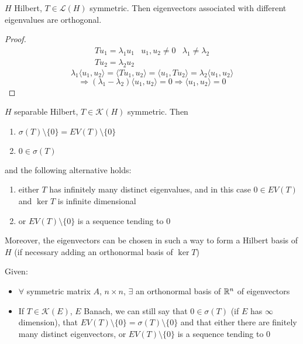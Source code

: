 \begin{proposition}
    \(H\) Hilbert, \(T \in \mathcal{L}(H)\) symmetric. Then eigenvectors associated with different eigenvalues are orthogonal. 
\end{proposition}
\begin{proof}
    \[
        \begin{array}{ccc}
            Tu_1 = \lambda_1 u_1 & u_1, u_2 \neq 0 & \lambda_1 \neq \lambda_2 \\
            Tu_2 = \lambda_2 u_2 
        \end{array}
    \]
    \[
        \lambda_1 \langle u_1, u_2 \rangle = \langle Tu_1, u_2\rangle = \langle u_1, T u_2\rangle = \lambda_2 \langle u_1, u_2\rangle
    \]
    \[
        \Rightarrow (\lambda_1 - \lambda_2) \langle u_1, u_2\rangle = 0 \Rightarrow \langle u_1, u_2\rangle = 0
    \]
\end{proof}

\begin{theorem}
    \(H\) separable Hilbert, \(T \in \mathcal{K}(H)\) symmetric. Then
    \begin{enumerate}
        \item \(\sigma(T) \setminus \{0\} = EV (T) \setminus \{0\}\)
        \item \(0 \in \sigma(T)\)
    \end{enumerate}
    and the following alternative holds:
    \begin{enumerate}
        \item either \(T\) has infinitely many distinct eigenvalues, and in this case \(0 \in EV(T)\) and \(\ker T\) is infinite dimensional
        \item or \(EV(T) \setminus \{0\} \) is a sequence tending to \(0\)
    \end{enumerate}
    Moreover, the eigenvectors can be chosen in such a way to form a Hilbert basis of \(H\) (if necessary adding an orthonormal basis of \(\ker T\))
\end{theorem}

\begin{remark}
    Given:
    \begin{itemize}
        \item \(\forall\) symmetric matrix \(A\), \(n \times n \), \(\exists\) an orthonormal basis of \(\mathbb{R}^n\) of eigenvectors
        \item If \(T \in \mathcal{K}(E)\), \(E\) Banach, we can still say that \(0 \in \sigma(T)\) (if \(E\) has \(\infty\) dimension), that \(EV(T) \setminus \{0\} = \sigma(T) \setminus \{0\}\) and that either there are finitely many distinct eigenvectors, or \(EV(T) \setminus \{0\}\) is a sequence tending to \(0\)
    \end{itemize}
\end{remark}

